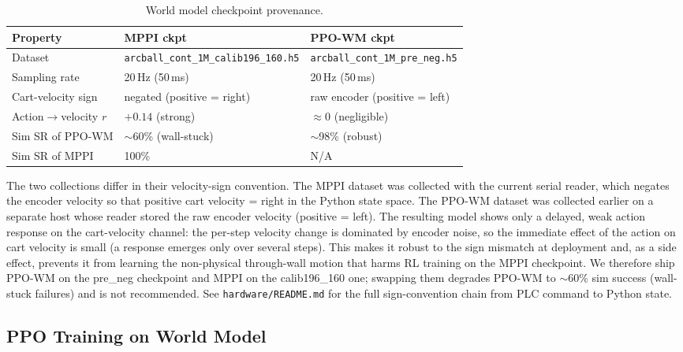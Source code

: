 \begin{table}[H]
\centering
\caption{World model checkpoint provenance.}
\label{tab:wm_provenance}
\scriptsize
\setlength{\tabcolsep}{2pt}
\begin{tabular}{lp{3cm}p{3cm}}
\toprule
\textbf{Property} & \textbf{MPPI ckpt} & \textbf{PPO-WM ckpt} \\
\midrule
Dataset & \texttt{arcball\_\allowbreak cont\_\allowbreak 1M\_\allowbreak calib196\_\allowbreak 160.h5} & \texttt{arcball\_\allowbreak cont\_\allowbreak 1M\_\allowbreak pre\_\allowbreak neg.h5} \\
Sampling rate & 20\,Hz (50\,ms) & 20\,Hz (50\,ms) \\
Cart-velocity sign & negated (positive = right) & raw encoder (positive = left) \\
Action$\to$velocity $r$ & $+0.14$ (strong) & $\approx 0$ (negligible) \\
Sim SR of PPO-WM & $\sim$60\% (wall-stuck) & $\sim$98\% (robust) \\
Sim SR of MPPI & 100\% & N/A \\
\bottomrule
\end{tabular}
\end{table}

The two collections differ in their velocity-sign convention. The
MPPI dataset was collected with the current serial reader, which negates
the encoder velocity so that positive cart velocity = right in the
Python state space. The PPO-WM dataset was collected earlier on a
separate host whose reader stored the raw encoder velocity (positive =
left). The resulting model shows only a delayed, weak action response on the
cart-velocity channel: the per-step velocity change is dominated by encoder
noise, so the immediate effect of the action on cart velocity is small (a
response emerges only over several steps).
This makes it robust to the sign mismatch at deployment and, as a side
effect, prevents it from learning the non-physical through-wall motion
that harms RL training on the MPPI checkpoint. We therefore ship
PPO-WM on the pre\_neg checkpoint and MPPI on the calib196\_160 one;
swapping them degrades PPO-WM to $\sim$60\% sim success (wall-stuck
failures) and is not recommended. See \texttt{hardware/README.md} for the
full sign-convention chain from PLC command to Python state.

\subsection{PPO Training on World Model}

